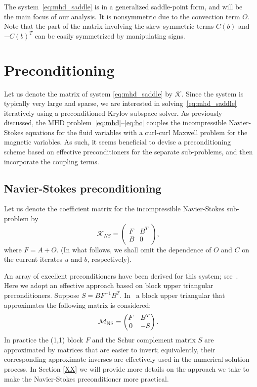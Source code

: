 \documentclass{siamltex}
\begin{document}
The system~\eqref{eq:mhd_saddle} is in a generalized saddle-point form, and will be the main focus of our analysis. It is nonsymmetric due to the convection term $O$. Note that the part of the matrix involving the skew-symmetric terms  $C(b)$ and $-C(b)^T$ can be easily symmetrized by manipulating signs.

\section{Preconditioning}
\label{sec:preconditioning}
Let us denote the matrix of system \eqref{eq:mhd_saddle} by $\mathcal{K}$. Since the system is typically very large and sparse, we are interested in solving~\eqref{eq:mhd_saddle} iteratively using a preconditioned Krylov subspace solver. As previously discussed, the MHD problem~\eqref{eq:mhd}--\eqref{eq:bc} couples the incompressible Navier-Stokes equations for the fluid variables with a curl-curl Maxwell problem for the magnetic variables. As such, it seems beneficial to devise a preconditioning scheme based on effective preconditioners for the separate sub-problems, and then incorporate the coupling terms.

\subsection{Navier-Stokes preconditioning}

Let us denote the coefficient matrix for the incompressible Navier-Stokes sub-problem by
\begin{equation}
\label{eq:ns_coeff}
\mathcal{K}_{NS}=
\begin{pmatrix}
F & B^T \\
B & 0
\end{pmatrix},
\end{equation}
where $F = A+O$. (In what follows, we shall omit the dependence of $O$ and $C$ on the current iterates $u$ and $b$,
respectively).


An array of excellent preconditioners have been derived for this system; see~\cite{elman-silvester-wathen}. Here we adopt an effective approach based on block upper triangular preconditioners. Suppose $S=B F^{-1} B^T$.
In~\cite{Elman06, Kay02} a block upper triangular that approximates the following matrix is considered:
\begin{equation}
\label{eq:ns_pc_upper}
\mathcal{M}_{\rm NS} =
\begin{pmatrix}
F & B^T \\
0 & -S
\end{pmatrix}.
\end{equation}
In practice the (1,1) block $F$ and the Schur complement matrix $S$ are approximated by matrices that are easier to invert; equivalently, their corresponding approximate inverses are effectively used in the numerical solution process. In Section \ref{XX} we will provide more details on the approach we take to make the Navier-Stokes preconditioner more practical.
\end{document}
